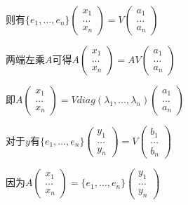 \documentclass{article}
\begin{document}
则有$\{e_1,\dots,e_n\}\left(
    \begin{array}{c}
        x_1 \\
        \dots \\
        x_n
    \end{array}
\right)=V\left(
    \begin{array}{c}
        a_1 \\
        \dots \\
        a_n
    \end{array}
\right)$

两端左乘$A$可得$A\left(
    \begin{array}{c}
        x_1 \\
        \dots \\
        x_n
    \end{array}
\right)=AV\left(
    \begin{array}{c}
        a_1 \\
        \dots \\
        a_n
    \end{array}
\right)$

即$A\left(
    \begin{array}{c}
        x_1 \\
        \dots \\
        x_n
    \end{array}
\right)=Vdiag(\lambda_1,\dots,\lambda_n)\left(
    \begin{array}{c}
        a_1 \\
        \dots \\
        a_n
    \end{array}
\right)$

对于$y$有$\{e_1,\dots,e_n\}\left(
    \begin{array}{c}
        y_1 \\
        \dots \\
        y_n
    \end{array}
\right)=V\left(
    \begin{array}{c}
        b_1 \\
        \dots \\
        b_n
    \end{array}
\right)$

因为$A\left(
    \begin{array}{c}
        x_1 \\
        \dots \\
        x_n
    \end{array}
\right)=\{e_1,\dots,e_n\}\left(
    \begin{array}{c}
        y_1 \\
        \dots \\
        y_n
    \end{array}
\right)$
\end{document}
